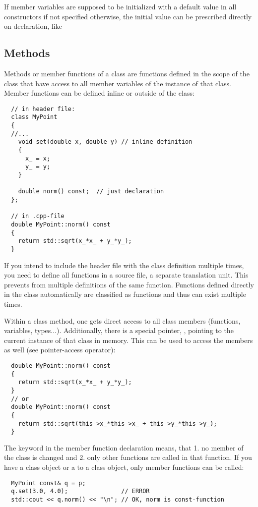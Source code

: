 If member variables are supposed to be initialized with a default value in all constructors if not specified otherwise, the initial value can be
prescribed directly on declaration, like 

\subsection{Methods}
Methods or member functions of a class are functions defined in the scope of the class that have access to all member variables of the instance of that class.
Member functions can be defined inline or outside of the class:
%
\begin{verbatim}
  // in header file:
  class MyPoint
  {
  //...
    void set(double x, double y) // inline definition
    {
      x_ = x;
      y_ = y;
    }

    double norm() const;  // just declaration
  };

  // in .cpp-file
  double MyPoint::norm() const
  {
    return std::sqrt(x_*x_ + y_*y_);
  }
\end{verbatim}

If you intend to include the header file with the class definition multiple times, you need to define all functions in a source file, \ie a separate
translation unit. This prevents from multiple definitions of the same function. Functions defined directly in the class automatically are classified as
 functions and thus can exist multiple times.

Within a class method, one gets direct access to all class members (functions, variables, types...). Additionally, there is a special pointer, ,
pointing to the current instance of that class in memory. This can be used to access the members as well (see pointer-access operator):
%
\begin{verbatim}
  double MyPoint::norm() const
  {
    return std::sqrt(x_*x_ + y_*y_);
  }
  // or
  double MyPoint::norm() const
  {
    return std::sqrt(this->x_*this->x_ + this->y_*this->y_);
  }
\end{verbatim}

The keyword  in the member function declaration means, that 1. no member of the class is changed and 2. only other  functions are called
in that function. If you have a  class object or a  to a class object, only  member functions can be called:
%
\begin{verbatim}
  MyPoint const& q = p;
  q.set(3.0, 4.0);               // ERROR
  std::cout << q.norm() << "\n"; // OK, norm is const-function
\end{verbatim}

